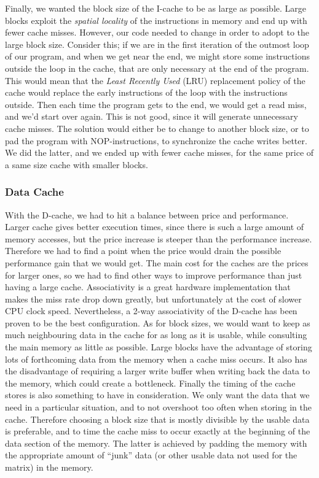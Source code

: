 \documentclass[a4paper,9pt,fleqn]{article}
\begin{document}
Finally, we wanted the block size of the I-cache to be as large as possible. Large blocks exploit the {\it spatial 
locality} of the instructions in memory and end up with fewer cache misses. However, our code needed to 
change in order to adopt to the large block size. Consider this; if we are in the first iteration of the 
outmost loop of our program, and when we get near the end, we might store some instructions outside 
the loop in the cache, that are only necessary at the end of the program. This would mean that the {\it 
Least Recently Used} (LRU) replacement policy of the cache would replace the early instructions of the 
loop with the instructions outside. Then each time the program gets to the end, we would get a read miss, 
and we'd start over again. This is not good, since it will generate unnecessary cache misses. The solution 
would either be to change to another block size, or to pad the program with NOP-instructions, to 
synchronize the cache writes better. We did the latter, and we ended up with fewer cache misses, for 
the same price of a same size cache with smaller blocks.

\subsubsection{Data Cache}
With the D-cache, we had to hit a balance between price and performance. Larger cache gives better 
execution times, since there is such a large amount of memory accesses, but the price increase is steeper 
than the performance increase. Therefore we had to find a point when the price would drain the possible 
performance gain that we would get. The main cost for the caches are the prices for larger ones, so we had to 
find other ways to improve performance than just having a large cache. Associativity is a great hardware 
implementation that makes the miss rate drop down greatly, but unfortunately at the cost of slower CPU 
clock speed. Nevertheless, a 2-way associativity of the D-cache has been proven to be the  best 
configuration. As for block sizes, we would want to keep as much neighbouring data in the cache for as long as 
it is usable, while consulting the main memory as little as possible. Large blocks have the advantage 
of storing lots of forthcoming data from the memory when a cache miss occurs. It also has the disadvantage
of requiring a larger write buffer when writing back the data to the memory, which could create a bottleneck.
Finally the timing of the cache stores is also something to have in consideration. We only want the
data that we need in a particular situation, and to not overshoot too often when storing in the cache. Therefore
choosing a block size that is mostly divisible by the usable data is preferable, and to time the cache miss
to occur exactly at the beginning of the data section of the memory. The latter is achieved by padding the
memory with the appropriate amount of ``junk'' data (or other usable data not used for the matrix) in the memory.  
\end{document}
